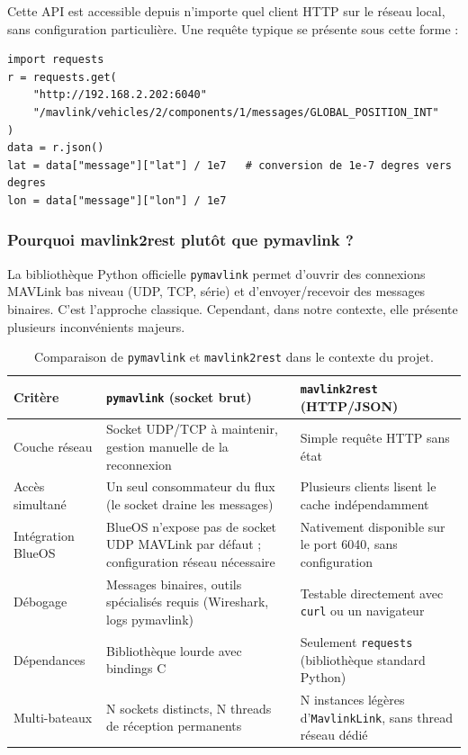 Cette API est accessible depuis n'importe quel client HTTP sur le réseau local, sans configuration particulière. Une requête typique se présente sous cette forme :

\begin{lstlisting}[style=python, caption={Exemple de requête GET vers mavlink2rest pour lire la position GPS du bateau 2.}]
import requests
r = requests.get(
    "http://192.168.2.202:6040"
    "/mavlink/vehicles/2/components/1/messages/GLOBAL_POSITION_INT"
)
data = r.json()
lat = data["message"]["lat"] / 1e7   # conversion de 1e-7 degres vers degres
lon = data["message"]["lon"] / 1e7
\end{lstlisting}

\subsubsection{Pourquoi mavlink2rest plutôt que pymavlink ?}

La bibliothèque Python officielle \texttt{pymavlink} permet d'ouvrir des connexions MAVLink bas niveau (UDP, TCP, série) et d'envoyer/recevoir des messages binaires. C'est l'approche classique. Cependant, dans notre contexte, elle présente plusieurs inconvénients majeurs.

\begin{table}[h]
  \centering
  \caption{Comparaison de \texttt{pymavlink} et \texttt{mavlink2rest} dans le contexte du projet.}
  \label{tab:mavlink_vs_rest}
  \renewcommand{\arraystretch}{1.3}
  \begin{tabularx}{\textwidth}{l X X}
    \toprule
    \textbf{Critère} & \textbf{\texttt{pymavlink} (socket brut)} & \textbf{\texttt{mavlink2rest} (HTTP/JSON)} \\
    \midrule
    Couche réseau
      & Socket UDP/TCP à maintenir, gestion manuelle de la reconnexion
      & Simple requête HTTP sans état \\
    Accès simultané
      & Un seul consommateur du flux (le socket draine les messages)
      & Plusieurs clients lisent le cache indépendamment \\
    Intégration BlueOS
      & BlueOS n'expose pas de socket UDP MAVLink par défaut ; configuration réseau nécessaire
      & Nativement disponible sur le port 6040, sans configuration \\
    Débogage
      & Messages binaires, outils spécialisés requis (Wireshark, logs pymavlink)
      & Testable directement avec \texttt{curl} ou un navigateur \\
    Dépendances
      & Bibliothèque lourde avec bindings C
      & Seulement \texttt{requests} (bibliothèque standard Python) \\
    Multi-bateaux
      & N sockets distincts, N threads de réception permanents
      & N instances légères d'\texttt{MavlinkLink}, sans thread réseau dédié \\
    \bottomrule
  \end{tabularx}
\end{table}

